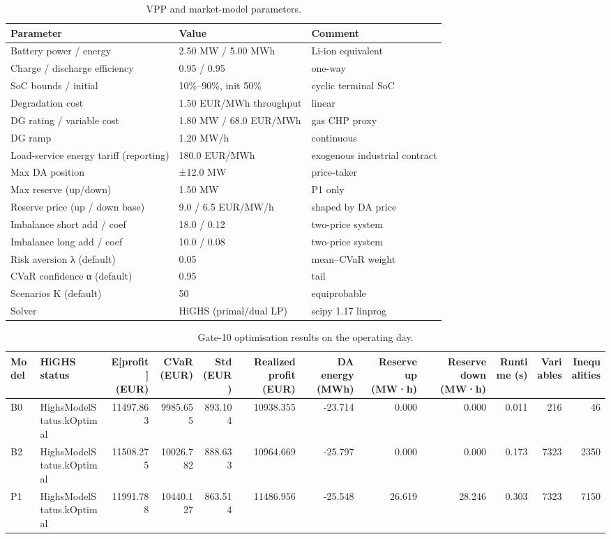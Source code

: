 \begin{table}
\caption{VPP and market-model parameters.}
\label{tab:params}
\begin{tabular}{lll}
\toprule
Parameter & Value & Comment \\
\midrule
Battery power / energy & 2.50 MW / 5.00 MWh & Li-ion equivalent \\
Charge / discharge efficiency & 0.95 / 0.95 & one-way \\
SoC bounds / initial & 10\%–90\%, init 50\% & cyclic terminal SoC \\
Degradation cost & 1.50 EUR/MWh throughput & linear \\
DG rating / variable cost & 1.80 MW / 68.0 EUR/MWh & gas CHP proxy \\
DG ramp & 1.20 MW/h & continuous \\
Load-service energy tariff (reporting) & 180.0 EUR/MWh & exogenous industrial contract \\
Max DA position & ±12.0 MW & price-taker \\
Max reserve (up/down) & 1.50 MW & P1 only \\
Reserve price (up / down base) & 9.0 / 6.5 EUR/MW/h & shaped by DA price \\
Imbalance short add / coef & 18.0 / 0.12 & two-price system \\
Imbalance long add / coef & 10.0 / 0.08 & two-price system \\
Risk aversion λ (default) & 0.05 & mean–CVaR weight \\
CVaR confidence α (default) & 0.95 & tail \\
Scenarios K (default) & 50 & equiprobable \\
Solver & HiGHS (primal/dual LP) & scipy 1.17 linprog \\
\bottomrule
\end{tabular}
\end{table}


\begin{table}
\caption{Gate-10 optimisation results on the operating day.}
\label{tab:opt}
\begin{tabular}{llrrrrrrrrrr}
\toprule
Model & HiGHS status & E[profit] (EUR) & CVaR (EUR) & Std (EUR) & Realized profit (EUR) & DA energy (MWh) & Reserve up (MW·h) & Reserve down (MW·h) & Runtime (s) & Variables & Inequalities \\
\midrule
B0 & HighsModelStatus.kOptimal & 11497.863 & 9985.655 & 893.104 & 10938.355 & -23.714 & 0.000 & 0.000 & 0.011 & 216 & 46 \\
B2 & HighsModelStatus.kOptimal & 11508.275 & 10026.782 & 888.633 & 10964.669 & -25.797 & 0.000 & 0.000 & 0.173 & 7323 & 2350 \\
P1 & HighsModelStatus.kOptimal & 11991.788 & 10440.127 & 863.514 & 11486.956 & -25.548 & 26.619 & 28.246 & 0.303 & 7323 & 7150 \\
\bottomrule
\end{tabular}
\end{table}


